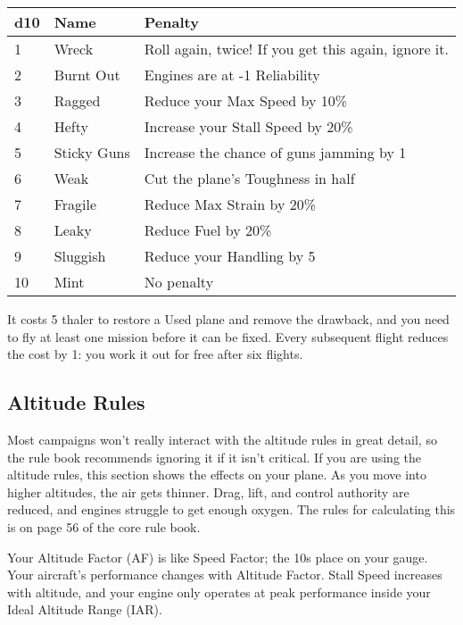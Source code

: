 \documentclass{article}
\begin{document}
\begin{tabular}{|l|l|l|}
  \hline
  d10 & Name        & Penalty                                              \\\hline
  1   & Wreck       & Roll again, twice! If you get this again, ignore it. \\\hline
  2   & Burnt Out   & Engines are at -1 Reliability                        \\\hline
  3   & Ragged      & Reduce your Max Speed by 10\%                        \\\hline
  4   & Hefty       & Increase your Stall Speed by 20\%                    \\\hline
  5   & Sticky Guns & Increase the chance of guns jamming by 1             \\\hline
  6   & Weak        & Cut the plane's Toughness in half                    \\\hline
  7   & Fragile     & Reduce Max Strain by 20\%                            \\\hline
  8   & Leaky       & Reduce Fuel by 20\%                                  \\\hline
  9   & Sluggish    & Reduce your Handling by 5                            \\\hline
  10  & Mint        & No penalty                                           \\\hline
\end{tabular}

It costs 5 thaler to restore a Used plane and remove the
drawback, and you need to fly at least one mission before it can be
fixed. Every subsequent flight reduces the cost by 1: you work it out
for free after six flights.

\subsection{Altitude Rules}
\label{_Altitude_Rules}

Most campaigns won't really interact with the altitude rules in great
detail, so the rule book recommends ignoring it if it isn't critical. If
you are using the altitude rules, this section shows the effects on your
plane. As you move into higher altitudes, the air gets thinner. Drag,
lift, and control authority are reduced, and engines struggle to get
enough oxygen. The rules for calculating this is on page 56 of the core
rule book.

Your Altitude Factor (AF) is like Speed Factor; the 10s place on your
gauge. Your aircraft's performance changes with Altitude Factor. Stall
Speed increases with altitude, and your engine only operates at peak
performance inside your Ideal Altitude Range (IAR).
\end{document}
